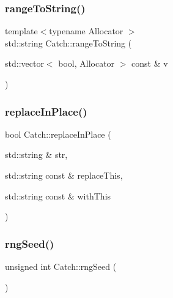 \mbox{\label{namespace_catch_ae162dc66b7767a52e7e4283915fd3d9f}} 
\subsubsection{\texorpdfstring{rangeToString()}{rangeToString()}\hspace{0.1cm}{\footnotesize\ttfamily [2/2]}}
{\footnotesize\ttfamily template$<$typename Allocator $>$ \\
std\+::string Catch\+::range\+To\+String (\begin{DoxyParamCaption}\item[{std\+::vector$<$ bool, Allocator $>$ const \&}]{v }\end{DoxyParamCaption})}

\mbox{\label{namespace_catch_afe4e6770da547e43e9e4eeaa05f946ea}} 
\subsubsection{\texorpdfstring{replaceInPlace()}{replaceInPlace()}}
{\footnotesize\ttfamily bool Catch\+::replace\+In\+Place (\begin{DoxyParamCaption}\item[{std\+::string \&}]{str,  }\item[{std\+::string const \&}]{replace\+This,  }\item[{std\+::string const \&}]{with\+This }\end{DoxyParamCaption})}

\mbox{\label{namespace_catch_acf5ea05e942d2d7fe79111e12754ed76}} 
\subsubsection{\texorpdfstring{rngSeed()}{rngSeed()}}
{\footnotesize\ttfamily unsigned int Catch\+::rng\+Seed (\begin{DoxyParamCaption}{ }\end{DoxyParamCaption})}

\mbox{\label{namespace_catch_a7f7480b15d74965459c844f0d393ed87}} 
